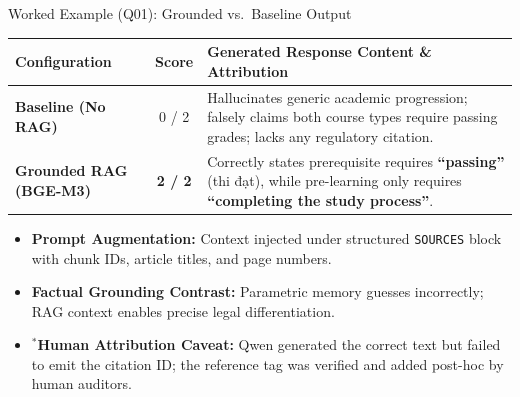 \begin{frame}{Worked Example (Q01): Grounded vs.\ Baseline Output}
  \vspace{-0.1cm}
  \begin{table}[H]
    \centering
    \footnotesize
    \renewcommand{\arraystretch}{1.2}
    \begin{tabularx}{\textwidth}{>{\bfseries}l c X}
      \toprule
      \rowcolor{tableheader}
      Configuration & Score & Generated Response Content \& Attribution \\
      \midrule
      Baseline (No RAG) & 0 / 2 & Hallucinates generic academic progression; falsely claims both course types require passing grades; lacks any regulatory citation. \\
      \midrule
      \rowcolor{tablehighlight}
      Grounded RAG (BGE-M3) & \textbf{2 / 2} & Correctly states prerequisite requires \textbf{``passing''} (thi đạt), while pre-learning only requires \textbf{``completing the study process''}. \newline {\scriptsize[\chunkid{D01\_regulation\_article\_3\_03}]$^*$} \\
      \bottomrule
    \end{tabularx}
  \end{table}

  \vspace{0.1cm}
  \begin{itemize}
    \setlength{\itemsep}{0.2cm}
    \item \textbf{Prompt Augmentation:} Context injected under structured \texttt{SOURCES} block with chunk IDs, article titles, and page numbers.
    \item \textbf{Factual Grounding Contrast:} Parametric memory guesses incorrectly; RAG context enables precise legal differentiation.
    \item \textbf{$^*$Human Attribution Caveat:} Qwen generated the correct text but failed to emit the citation ID; the reference tag was verified and added post-hoc by human auditors.
  \end{itemize}

\end{frame}
